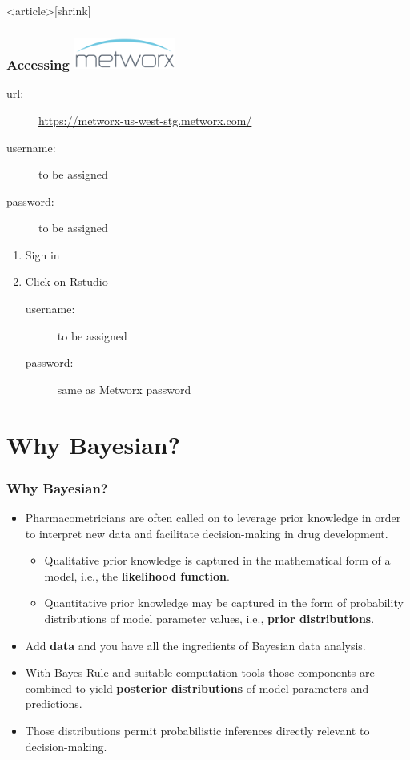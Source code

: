 \documentclass[handout]{beamer}
\begin{document}
\begin{frame}<article>[shrink]
  \frametitle{Accessing \href{https://www.metrumrg.com/solution/metworx/}{\includegraphics[width=0.25\textwidth]{graphics/metworx.pdf}} }
  
  \begin{description}
  \item[url:] \url{https://metworx-us-west-stg.metworx.com/}
\item[username:] to be assigned
\item[password:] to be assigned
  \end{description}
  \begin{enumerate}
  \item Sign in
\item Click on Rstudio 
  \begin{description}
  \item[username:] to be assigned
\item[password:] same as Metworx password
   \end{description}
  \end{enumerate}

\end{frame}

\section{Why Bayesian?}

\begin{frame}
  \frametitle{Why Bayesian?}

  \begin{itemize}
  \item<1-> Pharmacometricians are often called on to leverage prior knowledge
  in order to interpret new data and facilitate decision-making in
  drug development.
  \begin{itemize}
  \item<2-> Qualitative prior knowledge is captured in the mathematical
    form of a model, i.e., the \textcolor{mrggreen}{\bf likelihood function}.
  \item<3-> Quantitative prior knowledge may be captured in the form of
    probability distributions of model parameter values, i.e.,
    \textcolor{mrggreen}{\bf prior
    distributions}.
  \end{itemize}
  \item<4-> Add \textcolor{mrggreen}{\bf data} and you have all the ingredients of Bayesian data
    analysis.
\item<5-> With Bayes Rule and suitable computation tools those components
  are combined to yield \textcolor{mrggreen}{\bf posterior distributions} of model parameters
  and predictions.
\item<5-> Those distributions permit probabilistic inferences directly
  relevant to decision-making.
  \end{itemize}

\end{frame}
\end{document}
